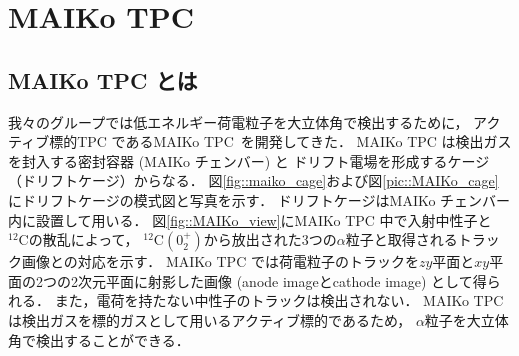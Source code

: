 \documentclass[../master]{subfiles}
\begin{document}
\chapter{MAIKo TPC}
\section{MAIKo TPC とは}
我々のグループでは低エネルギー荷電粒子を大立体角で検出するために，
アクティブ標的TPC であるMAIKo TPC~\cite{maiko}を開発してきた．
MAIKo TPC は検出ガスを封入する密封容器 (MAIKo チェンバー) と
ドリフト電場を形成するケージ（ドリフトケージ）からなる．
図\ref{fig::maiko_cage}および図\ref{pic::MAIKo_cage}にドリフトケージの模式図と写真を示す．
ドリフトケージはMAIKo チェンバー内に設置して用いる．
図\ref{fig::MAIKo_view}にMAIKo TPC 中で入射中性子と${}^{12}\mathrm{C}$の散乱によって，
${}^{12}\mathrm{C} (0_2^+)$から放出された3つの$\alpha$粒子と取得されるトラック画像との対応を示す．
MAIKo TPC では荷電粒子のトラックを$zy$平面と$xy$平面の2つの2次元平面に射影した画像
(anode imageとcathode image) として得られる．
また，電荷を持たない中性子のトラックは検出されない．
MAIKo TPC は検出ガスを標的ガスとして用いるアクティブ標的であるため，
$\alpha$粒子を大立体角で検出することができる．
\end{document}
